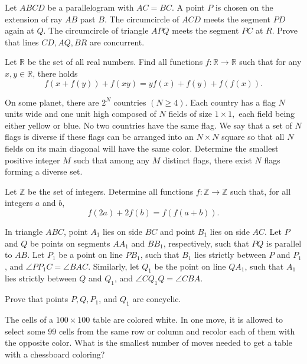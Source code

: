 \documentclass[11pt]{scrartcl}
\begin{document}
\begin{problem}[682786464566571]
Let $ABCD$ be a parallelogram with $AC=BC.$ A point $P$ is chosen on the extension of ray $AB$ past $B.$ The circumcircle of $ACD$ meets the segment $PD$ again at $Q.$ The circumcircle of triangle $APQ$ meets the segment $PC$ at $R.$ Prove that lines $CD,AQ,BR$ are concurrent.
\end{problem}
\begin{problem}[683000769221383]
	Let $\mathbb{R}$ be the set of all real numbers. Find all functions $f:\mathbb{R}\to\mathbb{R}$ such that for any $x,y\in \mathbb{R}$, there holds
\[f(x+f(y))+f(xy)=yf(x)+f(y)+f(f(x)).\]
\end{problem}
\begin{problem}[683710365849473]
	On some planet, there are $2^N$ countries $(N \geq 4).$ Each country has a flag $N$ units wide and one unit high composed of $N$ fields of size $1 \times 1,$ each field being either yellow or blue. No two countries have the same flag. We say that a set of $N$ flags is diverse if these flags can be arranged into an $N \times N$ square so that all $N$ fields on its main diagonal will have the same color. Determine the smallest positive integer $M$ such that among any $M$ distinct flags, there exist $N$ flags forming a diverse set.
\end{problem}
\begin{problem}[684265043263216]
Let $\mathbb{Z}$ be the set of integers. Determine all functions $f: \mathbb{Z} \rightarrow \mathbb{Z}$ such that, for all integers $a$ and $b$,$$f(2a)+2f(b)=f(f(a+b)).$$
\end{problem}
\begin{problem}[684771433215596]
In triangle $ABC$, point $A_1$ lies on side $BC$ and point $B_1$ lies on side $AC$. Let $P$ and $Q$ be points on segments $AA_1$ and $BB_1$, respectively, such that $PQ$ is parallel to $AB$. Let $P_1$ be a point on line $PB_1$, such that $B_1$ lies strictly between $P$ and $P_1$, and $\angle PP_1C=\angle BAC$. Similarly, let $Q_1$ be the point on line $QA_1$, such that $A_1$ lies strictly between $Q$ and $Q_1$, and $\angle CQ_1Q=\angle CBA$.

Prove that points $P,Q,P_1$, and $Q_1$ are concyclic.
\end{problem}
\begin{problem}[685138775901874]
The cells of a $100 \times 100$ table are colored white. In one move, it is allowed to select some $99$ cells from the same row or column and recolor each of them with the opposite color. What is the smallest number of moves needed to get a table with a chessboard coloring?
\end{problem}
\end{document}
